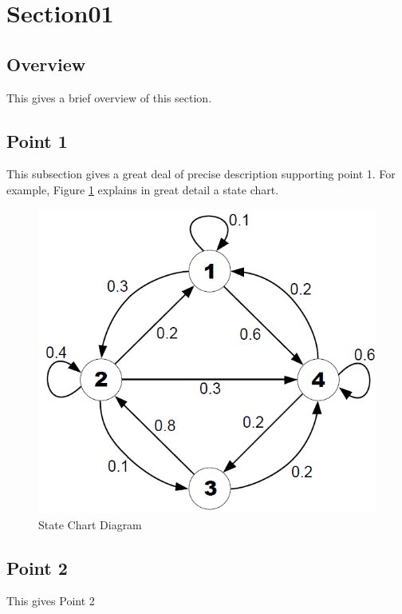 \section*{Section01}																	
\label{sec:Section01}

\subsection{Overview} 
This gives a brief overview of this section.

\subsection{Point 1}
This subsection gives a great deal of precise description supporting point 1.  For example,
Figure \ref{State Chart} explains in great detail a state chart.

\begin{figure}[htb]
\centering
\includegraphics[width=.5\textwidth]{section01/assets/sample_image.png}
\caption[Short Caption]{\label{State Chart}State Chart Diagram}
\end{figure}

\subsection{Point 2}
This gives Point 2
